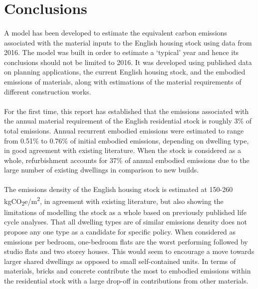 \documentclass[12pt]{article}
\begin{document}

\section{Conclusions}
\label{conclusions}

\paragraph{}
A model has been developed to estimate the equivalent carbon emissions associated with the material inputs to the English housing stock using data from 2016. The model was built in order to estimate a `typical’ year and hence its conclusions should not be limited to 2016. It was developed using published data on planning applications, the current English housing stock, and the embodied emissions of materials, along with estimations of the material requirements of different construction works. 

\paragraph{}
For the first time, this report has established that the emissions associated with the annual material requirement of the English residential stock is roughly 3\% of total emissions. Annual recurrent embodied emissions were estimated to range from 0.51\% to 0.76\% of initial embodied emissions, depending on dwelling type, in good agreement with existing literature. When the stock is considered as a whole, refurbishment accounts for 37\% of annual embodied emissions due to the large number of existing dwellings in comparison to new builds.

\paragraph{}
The emissions density of the English housing stock is estimated at 150-260 kgCO\textsubscript{2}e/m\textsuperscript{2}, in agreement with existing literature, but also showing the limitations of modelling the stock as a whole based on previously published life cycle analyses. That all dwelling types are of similar emissions density does not propose any one type as a candidate for specific policy. When considered as emissions per bedroom, one-bedroom flats are the worst performing followed by studio flats and two storey houses. This would seem to encourage a move towards larger shared dwellings as opposed to small self-contained units. In terms of materials, bricks and concrete contribute the most to embodied emissions within the residential stock with a large drop-off in contributions from other materials.
\end{document}
